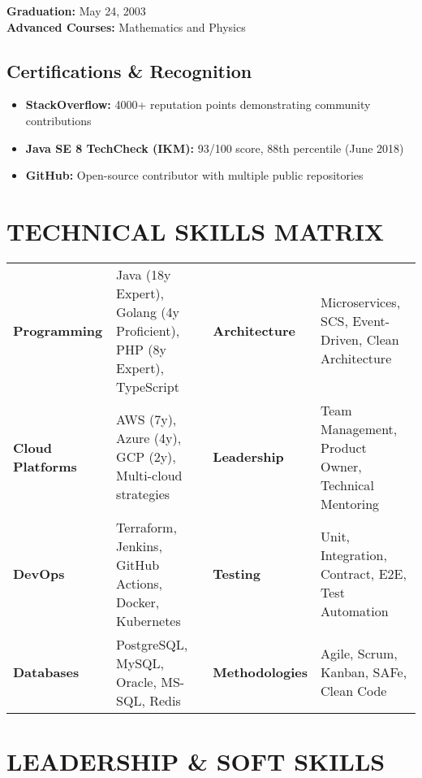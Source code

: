 \documentclass[10pt,a4paper]{article}
\newenvironment{compactlist}{\begin{itemize}[leftmargin=1em,itemsep=0pt,parsep=0pt,topsep=0pt,partopsep=0pt]}{\end{itemize}}
\begin{document}
\textbf{Graduation:} May 24, 2003\\
\textbf{Advanced Courses:} Mathematics and Physics

\subsection{Certifications \& Recognition}
\begin{compactlist}
\item \textbf{StackOverflow:} 4000+ reputation points demonstrating community contributions
\item \textbf{Java SE 8 TechCheck (IKM):} 93/100 score, 88th percentile (June 2018)
\item \textbf{GitHub:} Open-source contributor with multiple public repositories
\end{compactlist}

\section{TECHNICAL SKILLS MATRIX}

\begin{tabularx}{\textwidth}{lXlX}
\textbf{Programming} & Java (18y Expert), Golang (4y Proficient), PHP (8y Expert), TypeScript & \textbf{Architecture} & Microservices, SCS, Event-Driven, Clean Architecture \\
\textbf{Cloud Platforms} & AWS (7y), Azure (4y), GCP (2y), Multi-cloud strategies & \textbf{Leadership} & Team Management, Product Owner, Technical Mentoring \\
\textbf{DevOps} & Terraform, Jenkins, GitHub Actions, Docker, Kubernetes & \textbf{Testing} & Unit, Integration, Contract, E2E, Test Automation \\
\textbf{Databases} & PostgreSQL, MySQL, Oracle, MS-SQL, Redis & \textbf{Methodologies} & Agile, Scrum, Kanban, SAFe, Clean Code \\
\end{tabularx}

\section{LEADERSHIP \& SOFT SKILLS}
\end{document}
